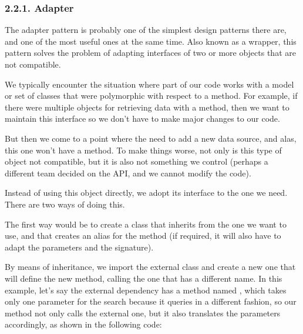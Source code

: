 \documentclass[a4paper,10pt,english]{sphinxmanual}
\begin{document}
\subsubsection{2.2.1. Adapter}
\label{\detokenize{chapters/9_design_patterns/index:adapter}}
The adapter pattern is probably one of the simplest design patterns there are, and one of the
most useful ones at the same time. Also known as a wrapper, this pattern solves the
problem of adapting interfaces of two or more objects that are not compatible.

We typically encounter the situation where part of our code works with a model or set of
classes that were polymorphic with respect to a method. For example, if there were
multiple objects for retrieving data with a  method, then we want to maintain this
interface so we don’t have to make major changes to our code.

But then we come to a point where the need to add a new data source, and alas, this one
won’t have a  method. To make things worse, not only is this type of object not
compatible, but it is also not something we control (perhaps a different team decided on the
API, and we cannot modify the code).

Instead of using this object directly, we adopt its interface to the one we need. There are
two ways of doing this.

The first way would be to create a class that inherits from the one we want to use, and that
creates an alias for the method (if required, it will also have to adapt the parameters and the
signature).

By means of inheritance, we import the external class and create a new one that will define
the new method, calling the one that has a different name. In this example, let’s say the
external dependency has a method named , which takes only one parameter for
the search because it queries in a different fashion, so our  method not only calls
the external one, but it also translates the parameters accordingly, as shown in the
following code:
\end{document}
